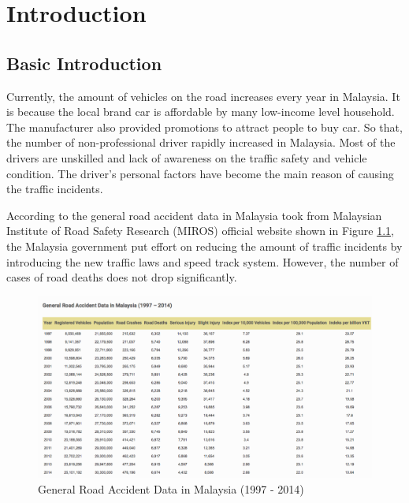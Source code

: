 \chapter{Introduction}
\section{Basic Introduction}
Currently, the amount of vehicles on the road increases every year in Malaysia.  
It is because the local brand car is affordable by many low-income level household. The manufacturer also provided promotions to attract people to buy car. So that, the number of non-professional driver rapidly increased in Malaysia. Most of the drivers are unskilled and lack of awareness on the traffic safety and vehicle condition. The driver's personal factors have become the main reason of causing the traffic incidents.

According to the general road accident data in Malaysia took from Malaysian Institute of Road Safety Research (MIROS) official website shown in Figure \ref{fig:accident}, the Malaysia government put effort on reducing the amount of traffic incidents by introducing the new traffic laws and speed track system. However, the number of cases of road deaths does not drop significantly. 

\begin{figure}[hbt!]\centering
\includegraphics[width=.75\textwidth]{image/accident}
\caption{General Road Accident Data in Malaysia (1997 - 2014)}
\label{fig:accident}
\end{figure}

